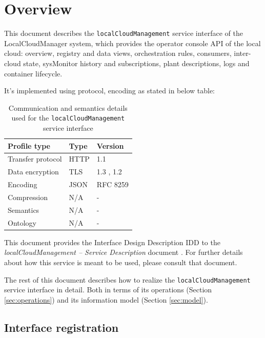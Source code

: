 \documentclass[a4paper]{arrowhead}
\begin{document}
\section{Overview}
\label{sec:overview}

This document describes the \texttt{local\allowbreak{}Cloud\allowbreak{}Management} service interface of the LocalCloudManager system, which provides the operator console API of the local cloud: overview, registry and data views, orchestration rules, consumers, inter-cloud state, sysMonitor history and subscriptions, plant descriptions, logs and container lifecycle.

It's implemented using protocol, encoding as stated in below table:
\begin{table}[ht!]
  \centering
  \begin{tabular}{|l|l|l|}
    \hline
    \rowcolor{gray!33} Profile type & Type & Version \\ \hline
    Transfer protocol & HTTP & 1.1 \cite{rfc9112} \\ \hline
    Data encryption & TLS & 1.3 \cite{rfc8446}, 1.2 \cite{rfc5246} \\ \hline
    Encoding & JSON & RFC 8259 \cite{rfc8259} \\ \hline
    Compression & N/A & - \\ \hline
    Semantics & N/A & - \\ \hline
    Ontology & N/A & - \\ \hline
  \end{tabular}
  \caption{Communication and semantics details used for the \texttt{local\allowbreak{}Cloud\allowbreak{}Management} service interface}
  \label{tab:comunication_semantics_profile}
\end{table}

This document provides the Interface Design Description IDD to the \textit{localCloudManagement -- Service Description} document \cite{lcm-localCloudManagement-sd}.
For further details about how this service is meant to be used, please consult that document.

The rest of this document describes how to realize the \texttt{local\allowbreak{}Cloud\allowbreak{}Management} service
interface in detail. Both in terms of its operations (Section \ref{sec:operations}) and its information model (Section \ref{sec:model}).

\subsection{Interface registration}
\end{document}
